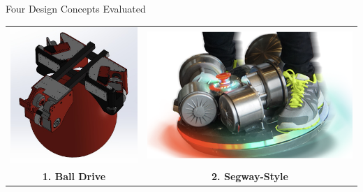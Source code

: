 \documentclass[aspectratio=169]{beamer}
\begin{document}
\begin{frame}{Four Design Concepts Evaluated}
\begin{center}
\begin{tabular}{cc}
\includegraphics[height=0.25\textheight]{pdpAssets/PreliminaryDesignCadRendering.jpg} &
\includegraphics[height=0.25\textheight]{pdpAssets/SegwayStyleSelfBalancingPlatform.png} \\
\textbf{1. Ball Drive} & \textbf{2. Segway-Style} \\[0.15cm]

\end{tabular}
\end{center}
\end{frame}
\end{document}
